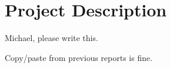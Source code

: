 \section{Project Description}

Michael, please write this.

Copy/paste from previous reports is fine.

